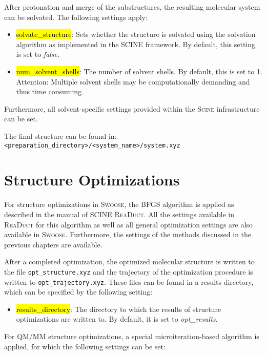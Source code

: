 \documentclass[]{tufte-book}
\begin{document}
{{After protonation and merge of the substructures, the resulting molecular system can be solvated. The following settings apply:

\begin{itemize}
\item \hl{solvate\_structure}: Sets whether the structure is solvated using the solvation algorithm as implemented in the \textsc{SCINE} framework. By default, this setting is set to \textit{false}.
\item \hl{num\_solvent\_shells}: The number of solvent shells. By default, this is set to 1. Attention: Multiple solvent shells may be computationally demanding and thus time consuming. 
\end{itemize}

Furthermore, all solvent-specific settings provided within the \textsc{Scine} infrastructure can be set. 

The final structure can be found in: \texttt{<preparation\_directory>/<system\_name>/system.xyz}  

\chapter{Structure Optimizations}\label{ch:struct_opt}

For structure optimizations in \textsc{Swoose}, the BFGS algorithm is applied as described in the manual of SCINE \textsc{ReaDuct}\cite{readuct}. All the settings available in \textsc{ReaDuct} for this algorithm as well as all general optimization settings are also available in \textsc{Swoose}. Furthermore, the settings of the methods discussed in the previous chapters are available.

After a completed optimization, the optimized molecular structure is written to the file \texttt{opt\_structure.xyz} and the trajectory of the optimization procedure is written to \texttt{opt\_trajectory.xyz}. These files can be found in a results directory, which can be specified by the following setting:

\begin{itemize}
\item \hl{results\_directory}: The directory to which the results of structure optimizations are written to. By default, it is set to \textit{opt\_results}.
\end{itemize}

For QM/MM structure optimizations, a special microiteration-based algorithm is applied, for which the following settings can be set:

}}
\end{document}
